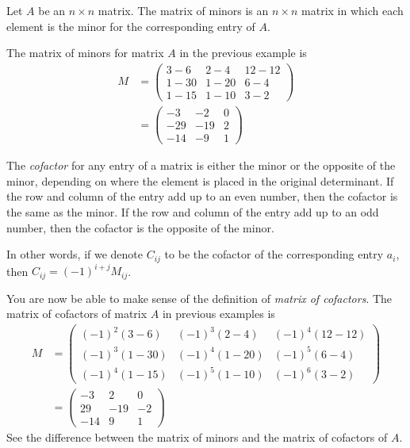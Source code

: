 	\begin{definition}
		Let $A$ be an $n\times n$ matrix. The matrix of minors is an $n\times n$ matrix in which each element is the minor for the corresponding entry of $A$.
	\end{definition}

	\begin{example}
		The matrix of minors for matrix $A$ in the previous example is
		\begin{align*}
			M
				& =
					\begin{pmatrix}
						3-6&2-4&12-12\\1-30&1-20&6-4\\1-15&1-10&3-2
					\end{pmatrix}\\
				& =
					\begin{pmatrix}
						-3&-2&0\\-29&-19&2\\-14&-9&1
					\end{pmatrix}
		\end{align*}
	\end{example}

	\begin{definition}[Cofactor]
		The \textit{cofactor} for any entry of a matrix is either the minor or the opposite of the minor, depending on where the element is placed in the original determinant. If the row and column of the entry add up to an even number, then the cofactor is the same as the minor. If the row and column of the entry add up to an odd number, then the cofactor is the opposite of the minor.

		In other words, if we denote $C_{ij}$ to be the cofactor of the corresponding entry $a_{i}$, then $C_{ij}=(-1)^{i+j} M_{ij}$.
	\end{definition}

	\begin{example}
		You are now be able to make sense of the definition of \textit{matrix of cofactors}. The matrix of cofactors of matrix $A$ in previous examples is
			\begin{align*}
				M
					& =
					\begin{pmatrix}
						(-1)^{2}(3-6)&(-1)^{3}(2-4)&(-1)^{4}(12-12)\\ 	(-1)^{3}(1-30)&(-1)^{4}(1-20)&(-1)^{5}(6-4)\\ (-1)^{4}(1-15)&(-1)^{5}(1-10)&(-1)^{6}(3-2)
					\end{pmatrix}\\
					& =
					\begin{pmatrix}
						-3&2&0\\29&-19&-2\\-14&9&1
					\end{pmatrix}
			\end{align*}
		See the difference between the matrix of minors and the matrix of cofactors of $A$.
	\end{example}

